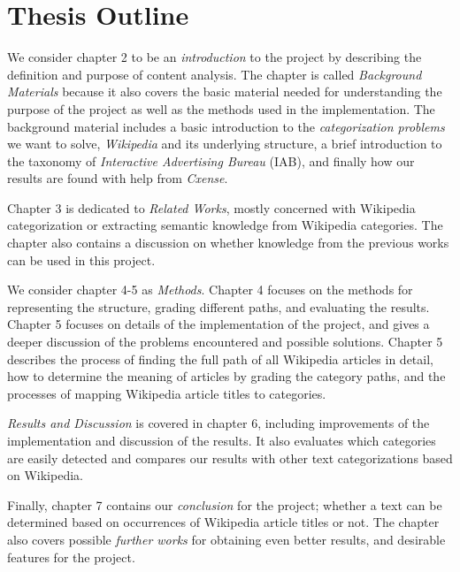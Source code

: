 \section{Thesis Outline}
\label{sec:thesis_outline}
We consider chapter 2 to be an \emph{introduction} to the project by describing the definition and purpose of content analysis. The chapter is called \emph{Background Materials} because it also covers the basic material needed for understanding the purpose of the project as well as the methods used in the implementation. The background material includes a basic introduction to the \emph{categorization problems} we want to solve, \emph{Wikipedia} and its underlying structure, a brief introduction to the taxonomy of \emph{Interactive Advertising Bureau} (IAB), and finally how our results are found with help from \emph{Cxense}.

Chapter 3 is dedicated to \emph{Related Works}, mostly concerned with Wikipedia categorization or extracting semantic knowledge from Wikipedia categories. The chapter also contains a discussion on whether knowledge from the previous works can be used in this project. 

We consider chapter 4-5 as \emph{Methods}. Chapter 4 focuses on the methods for representing the structure, grading different paths, and evaluating the results. Chapter 5 focuses on details of the implementation of the project, and gives a deeper discussion of the problems encountered and possible solutions. Chapter 5 describes the process of finding the full path of all Wikipedia articles in detail, how to determine the meaning of articles by grading the category paths, and the processes of mapping Wikipedia article titles to categories.

\emph{Results and Discussion} is covered in chapter 6, including improvements of the implementation and discussion of the results. It also evaluates which categories are easily detected and compares our results with other text categorizations based on Wikipedia.

Finally, chapter 7 contains our \emph{conclusion} for the project; whether a text can be determined based on occurrences of Wikipedia article titles or not. The chapter also covers possible \emph{further works} for obtaining even better results, and desirable features for the project. 


